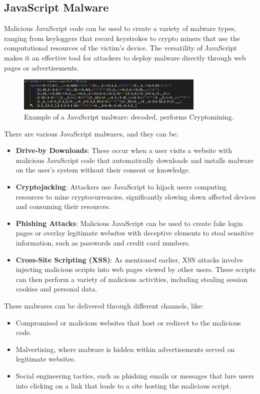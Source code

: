 \documentclass{article}
\begin{document}
\subsection{JavaScript Malware}
Malicious JavaScript code can be used to create a variety of malware types, ranging from keyloggers that record keystrokes to crypto miners that use the computational resources of the victim's device. The versatility of JavaScript makes it an effective tool for attackers to deploy malware directly through web pages or advertisements.

\begin{figure}[ht]
\centering
\includegraphics[width=0.8\textwidth]{images/4.png}
\caption{Example of a JavaScript malware: decoded, performs Cryptomining.}
\label{fig:cr}
\end{figure}

There are various JavaScript malwares, and they can be:
\begin{itemize}
	\item \textbf{Drive-by Downloads}: These occur when a user visits a website with malicious JavaScript code that automatically downloads and installs malware on the user's system without their consent or knowledge.
	\item \textbf{Cryptojacking}: Attacksrs use JavaScript to hijack users computing resources to mine cryptocurrencies, significantly slowing down affected devices and consuming their resources.
	\item \textbf{Phishing Attacks}: Malicious JavaScript can be used to create fake login pages or overlay legitimate websites with deceptive elements to steal sensitive information, such as passwords and credit card numbers.
	\item \textbf{Cross-Site Scripting (XSS)}: As mentioned earlier, XSS attacks involve injecting malicious scripts into web pages viewed by other users. These scripts can then perform a variety of malicious activities, including stealing session cookies and personal data.
\end{itemize}

These malwares can be delivered through different channels, like:
\begin{itemize}
	\item Compromised or malicious websites that host or redirect to the malicious code.
	\item Malvertising, where malware is hidden within advertisements served on legitimate websites.
	\item Social engineering tactics, such as phishing emails or messages that lure users into clicking on a link that leads to a site hosting the malicious script.
\end{itemize}
\end{document}
